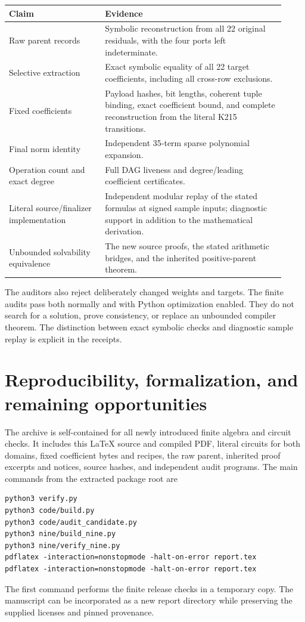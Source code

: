 \documentclass[11pt,letterpaper]{article}
\theoremstyle{definition}\newtheorem{definition}[theorem]{Definition}
\begin{document}
\begin{center}
\begin{tabular}{p{0.32\linewidth}p{0.60\linewidth}}
\toprule
Claim & Evidence\\
\midrule
Raw parent records & Symbolic reconstruction from all 22 original residuals,
with the four ports left indeterminate.\\
Selective extraction & Exact symbolic equality of all 22 target
coefficients, including all cross-row exclusions.\\
Fixed coefficients & Payload hashes, bit lengths, coherent tuple binding,
exact coefficient bound, and complete reconstruction from the literal K215 transitions.\\
Final norm identity & Independent 35-term sparse polynomial expansion.\\
Operation count and exact degree & Full DAG liveness and degree/leading
coefficient certificates.\\
Literal source/finalizer implementation & Independent modular replay of
the stated formulas at signed sample inputs; diagnostic support in addition
to the mathematical derivation.\\
Unbounded solvability equivalence & The new source proofs, the stated
arithmetic bridges, and the inherited positive-parent theorem.\\
\bottomrule
\end{tabular}
\end{center}

The auditors also reject deliberately changed weights and targets. The
finite audits pass both normally and with Python optimization enabled.
They do not search for a solution, prove consistency, or replace an
unbounded compiler theorem. The distinction between exact symbolic checks
and diagnostic sample replay is explicit in the receipts.



\section{Reproducibility, formalization, and remaining opportunities}
\label{sec:reproduce}

The archive is self-contained for all newly introduced finite algebra and
circuit checks. It includes this LaTeX source and compiled PDF, literal
circuits for both domains, fixed coefficient bytes and recipes, the raw
parent, inherited proof excerpts and notices, source hashes, and independent
audit programs. The main commands from the extracted package root are
\begin{verbatim}
python3 verify.py
python3 code/build.py
python3 code/audit_candidate.py
python3 nine/build_nine.py
python3 nine/verify_nine.py
pdflatex -interaction=nonstopmode -halt-on-error report.tex
pdflatex -interaction=nonstopmode -halt-on-error report.tex
\end{verbatim}
The first command performs the finite release checks in a temporary copy.
The manuscript can be incorporated as a new report directory while
preserving the supplied licenses and pinned provenance.
\end{document}
